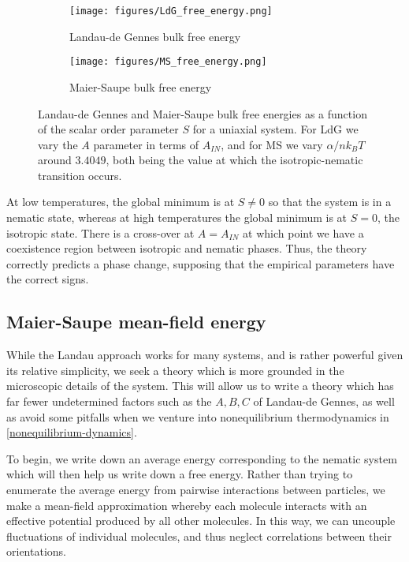 \documentclass[reqno]{article}
\begin{document}
  \begin{figure}[h]
    \centering
    \begin{subfigure}{0.45\textwidth}
      \texttt{[image: figures/LdG\_free\_energy.png]}
      \caption{Landau-de Gennes bulk free energy}
      \label{fig:ldg-free-energy}
    \end{subfigure}
    \hfill
    \begin{subfigure}{0.45\textwidth}
      \texttt{[image: figures/MS\_free\_energy.png]}
      \caption{Maier-Saupe bulk free energy}
      \label{fig:ms-free-energy}
    \end{subfigure}
    \caption{Landau-de Gennes and Maier-Saupe bulk free energies as a function
      of the scalar order parameter $S$ for a uniaxial system. For LdG we vary
      the $A$ parameter in terms of $A_{IN}$, and for MS we vary $\alpha / n
      k_BT$ around $3.4049$, both being the value at which the
      isotropic-nematic transition occurs.}
  \end{figure}
  At low temperatures, the global minimum is at $S \neq 0$ so that the system is
  in a nematic state, whereas at high temperatures the global minimum is at $S =
  0$, the isotropic state.
  There is a cross-over at $A = A_{IN}$ at which point we have a coexistence region
  between isotropic and nematic phases.
  Thus, the theory correctly predicts a phase change, supposing that the
  empirical parameters have the correct signs.

  \subsection{Maier-Saupe mean-field energy}
  While the Landau approach works for many systems, and is rather powerful given
  its relative simplicity, we seek a theory which is more grounded in the
  microscopic details of the system.
  This will allow us to write a theory which has far fewer undetermined factors
  such as the $A, B, C$ of Landau-de Gennes, as well as avoid some pitfalls when
  we venture into nonequilibrium thermodynamics in
  \ref{nonequilibrium-dynamics}.
  
  To begin, we write down an average energy corresponding to the nematic system
  which will then help us write down a free energy.
  Rather than trying to enumerate the average energy from pairwise interactions
  between particles, we make a mean-field approximation whereby each molecule
  interacts with an effective potential produced by all other molecules.
  In this way, we can uncouple fluctuations of individual molecules, and thus
  neglect correlations between their orientations.
\end{document}
